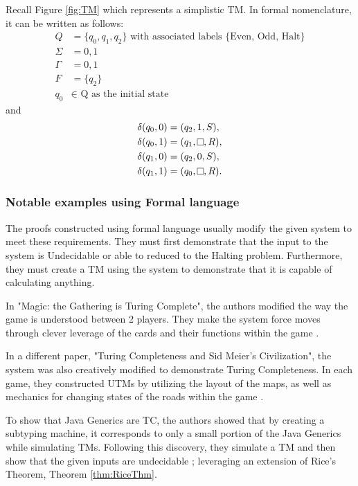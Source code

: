 Recall Figure \ref{fig:TM} which represents a simplistic TM.
In formal nomenclature, it can be written as follows:
\[
    \begin{aligned}
        Q &= \{q_{0}, q_{1}, q_{2}\} \text{ with associated labels \{Even, Odd, Halt\}}\\
        \Sigma &= {0,1}\\
        \Gamma &= {0,1}\\
        F &= \{q_{2}\}\\
        q_{0} &\in \text{ Q as the initial state}
    \end{aligned}
\]
and
\[
    \begin{aligned}
        \delta (q_{0}, 0) &= (q_{2}, 1, S),\\
        \delta (q_{0}, 1) &= (q_{1}, \raisebox{0.1cm}{\fbox{}}, R),\\
        \delta (q_{1}, 0) &= (q_{2}, 0, S),\\
        \delta (q_{1}, 1) &= (q_{0}, \raisebox{0.1cm}{\fbox{}}, R).\\
    \end{aligned}
\]

\subsubsection{Notable examples using Formal language}\label{subsubsec:NotableEgsFormalLang}

The proofs constructed using formal language usually modify the given system to meet these requirements.
They must first demonstrate that the input to the system is Undecidable or able to reduced to the Halting problem.
Furthermore, they must create a TM using the system to demonstrate that it is capable of calculating anything.

In "Magic: the Gathering is Turing Complete", the authors modified the way the game is understood between 2 players.
They make the system force moves through clever leverage of the cards and their functions within the game \cite{MtGTC}.

In a different paper, "Turing Completeness and Sid Meier's Civilization", the system was also creatively modified to demonstrate Turing Completeness.
In each game, they constructed UTMs by utilizing the layout of the maps, as well as mechanics for changing states of the roads within the game \cite{CivTC}.

To show that Java Generics are TC, the authors showed that by creating a subtyping machine, it corresponds to only a small portion of the Java Generics while simulating TMs.
Following this discovery, they simulate a TM and then show that the given inputs are undecidable \cite{JavaGenericsTC}; leveraging an extension of Rice's Theorem, Theorem \ref{thm:RiceThm}.

